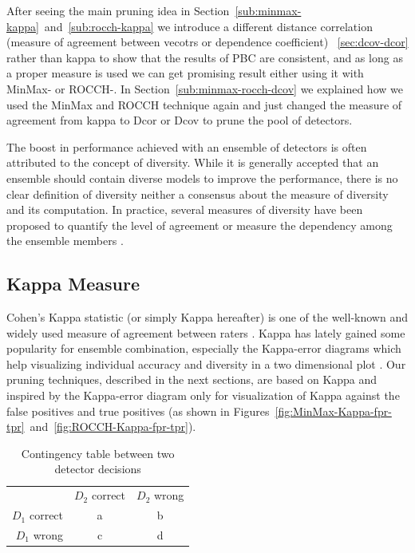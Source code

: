 After seeing the main pruning idea in Section~\ref{sub:minmax-kappa}~and~\ref{sub:rocch-kappa} we introduce a different distance correlation (measure of agreement between vecotrs or dependence coefficient) ~\ref{sec:dcov-dcor} rather than kappa to show that the results of PBC are consistent, and as long as a proper measure is used we can get promising result either using it with MinMax- or ROCCH-. In Section~\ref{sub:minmax-rocch-dcov} we explained how we used the MinMax and ROCCH technique again and just changed the measure of agreement from kappa to Dcor or Dcov to prune the pool of detectors.

The boost in performance achieved with an ensemble of detectors is often attributed to the concept of diversity.
While it is generally accepted that an ensemble should contain diverse models to improve the performance, there is no clear definition of diversity neither a consensus about the measure of diversity and its computation.
In practice, several measures of diversity have been proposed to quantify the level of agreement or measure the dependency among the ensemble members \cite{Kuncheva2003b}.


\subsection{Kappa Measure}
\label{sec:kappa}

Cohen's Kappa statistic (or simply Kappa hereafter) is one of the well-known and widely used measure of agreement between raters \cite{Cohen1995a}.
Kappa has lately gained some popularity for ensemble combination, especially the Kappa-error diagrams which help visualizing individual accuracy and diversity in a two dimensional plot \cite{Margineantu1997,Kunchev2013}.
Our pruning techniques, described in the next sections, are based on Kappa and inspired by the Kappa-error diagram only for visualization of Kappa against the false positives and true positives (as shown in Figures~\ref{fig:MinMax-Kappa-fpr-tpr}~and~\ref{fig:ROCCH-Kappa-fpr-tpr}).

\begin{table}[tbh]
    \normalsize
    \centering
    \renewcommand{\arraystretch}{1.3}
    \caption{Contingency table between two detector decisions}
    \label{Table::Contigency}
    \centering
    \begin{tabular}{ r|c|c| }
        \multicolumn{1}{r}{}
	 &  \multicolumn{1}{c}{$D_2$ correct}
	 & \multicolumn{1}{c}{$D_2$ wrong} \\
	\cline{2-3}
	$D_1$ correct & a & b \\
	\cline{2-3}
	$D_1$ wrong & c & d \\
	\cline{2-3}
    \end{tabular}
\end{table}

